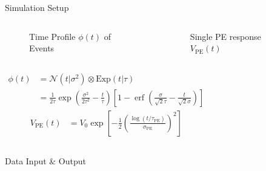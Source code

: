 \documentclass[final]{beamer}
\DeclareMathOperator{\erf}{erf}
\newlength{\colwidth}
\begin{document}
\begin{frame}[t]
\begin{columns}[t]
\begin{column}{\colwidth}
\begin{block}{Simulation Setup}
    \begin{columns}
      \begin{figure}
        \centering
        \resizebox{0.9\textwidth}{!}{}
        \caption{Time Profile $\phi(t)$ of Events}
      \end{figure}
      \begin{figure}
        \centering
        \resizebox{0.9\textwidth}{!}{}
        \caption{Single PE response $V_\mathrm{PE}(t)$\cite{jetter_pmt_2012}}
      \end{figure}
      \end{columns}
    \begin{columns}
    \begin{align*}
        \phi(t) &= \mathcal{N}(t|\sigma^2)\otimes \mathrm{Exp}(t|\tau) \\
        &= \frac{1}{2\tau} \exp\left(\frac{\sigma^2}{2\tau^2}-\frac{t}{\tau}\right) \left[1 - \erf\left( \frac{\sigma}{\sqrt{2}\tau} - \frac{t}{\sqrt{2}\sigma} \right)\right]
    \end{align*}
    \begin{align*}
      V_\mathrm{PE}(t) &= V_{0}\exp\left[-\frac{1}{2}\left(\frac{\log(t/\tau_\mathrm{PE})}{\sigma_\mathrm{PE}}\right)^{2}\right]
    \end{align*}
    \end{columns}

  \end{block}


  \begin{block}{Data Input \& Output}


\end{block}
\end{column}
\end{columns}
\end{frame}
\end{document}

